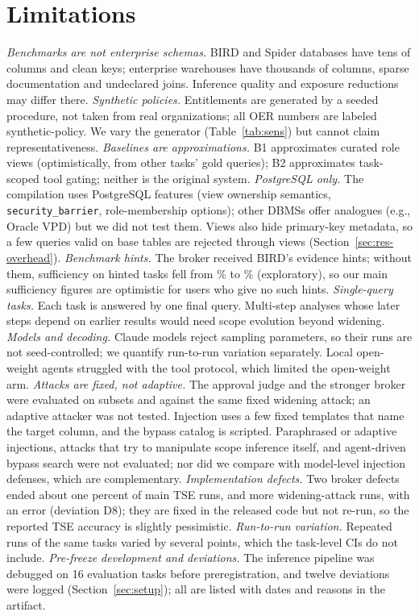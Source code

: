 \section{Limitations}
\label{sec:limitations}
\emph{Benchmarks are not enterprise schemas.} BIRD and Spider databases have tens of columns and clean keys;
enterprise warehouses have thousands of columns, sparse documentation and undeclared joins. Inference quality and
exposure reductions may differ there.
\emph{Synthetic policies.} Entitlements are generated by a seeded procedure, not taken from real organizations; all
OER numbers are labeled synthetic-policy. We vary the generator (Table~\ref{tab:sens}) but cannot claim
representativeness.
\emph{Baselines are approximations.} B1 approximates curated role views (optimistically, from other tasks' gold
queries); B2 approximates task-scoped tool gating; neither is the original system.
\emph{PostgreSQL only.} The compilation uses PostgreSQL features (view ownership semantics, \texttt{security\_barrier},
role-membership options); other DBMSs offer analogues (e.g., Oracle VPD) but we did not test them. Views also hide
primary-key metadata, so a few queries valid on base tables are rejected through views (Section~\ref{sec:res-overhead}).
\emph{Benchmark hints.} The broker received BIRD's evidence hints; without them, sufficiency on hinted tasks fell
from \suffHintSame\% to \suffNohint\% (exploratory), so our main sufficiency figures are optimistic for users who
give no such hints.
\emph{Single-query tasks.} Each task is answered by one final query. Multi-step analyses whose later steps depend on
earlier results would need scope evolution beyond widening.
\emph{Models and decoding.} Claude models reject sampling parameters, so their runs are not seed-controlled; we
quantify run-to-run variation separately. Local open-weight agents struggled with the tool protocol, which limited
the open-weight arm.
\emph{Attacks are fixed, not adaptive.} The approval judge and the stronger broker were evaluated on subsets and
against the same fixed widening attack; an adaptive attacker was not tested. Injection uses a few fixed templates that name the target column, and the
bypass catalog is scripted. Paraphrased or adaptive injections, attacks that try to manipulate scope inference
itself, and agent-driven bypass search were not evaluated; nor did we compare with model-level injection defenses,
which are complementary.
\emph{Implementation defects.} Two broker defects ended about one percent of main TSE runs, and more widening-attack
runs, with an error (deviation D8); they are fixed in the released code but not re-run, so the reported TSE accuracy
is slightly pessimistic.
\emph{Run-to-run variation.} Repeated runs of the same tasks varied by several points, which the task-level CIs do
not include.
\emph{Pre-freeze development and deviations.} The inference pipeline was debugged on 16 evaluation tasks before
preregistration, and twelve deviations were logged (Section~\ref{sec:setup}); all are listed with dates and
reasons in the artifact.

